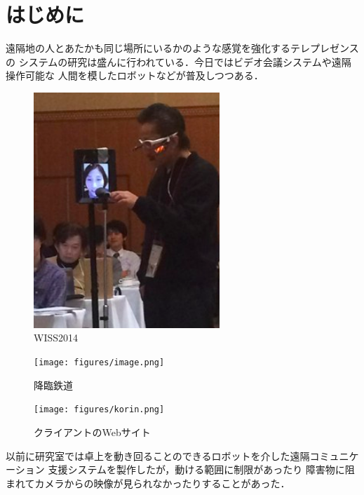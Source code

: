 \documentclass[submit,techreq]{ipsj}
\begin{document}
\section{はじめに}

遠隔地の人とあたかも同じ場所にいるかのような感覚を強化するテレプレゼンスの
システムの研究は盛んに行われている．今日ではビデオ会議システムや遠隔操作可能な
人間を模したロボットなどが普及しつつある．

\begin{figure}[H]
\begin{center}
\includegraphics[width=70mm,bb=0 0 241 306]{figures/b74f4564d4b38d12e48fcf80fef96def.png}
\end{center}
\caption{WISS2014}
\label{screenshot1}
\end{figure}

\begin{figure}[H]
\begin{center}
\texttt{[image: figures/image.png]}
\end{center}
\caption{降臨鉄道}
\label{screenshot2}
\end{figure}

\begin{figure}[H]
\begin{center}
\texttt{[image: figures/korin.png]}
\end{center}
\caption{クライアントのWebサイト}
\label{screenshot3}
\end{figure}

以前に研究室では卓上を動き回ることのできるロボットを介した遠隔コミュニケーション
支援システムを製作した\cite{Hirota:Korin}が，動ける範囲に制限があったり
障害物に阻まれてカメラからの映像が見られなかったりすることがあった．
\end{document}

